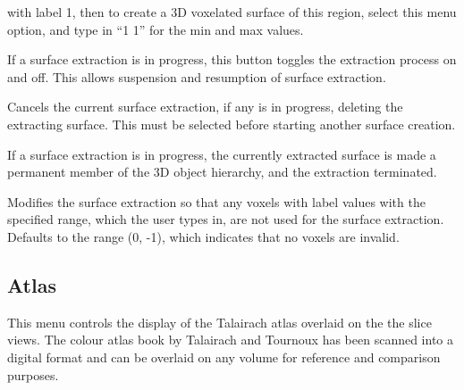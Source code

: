 \documentclass[11pt,letterpaper]{article}
\newcommand{\menutwo}[2]{{\scriptsize \fbox{\bf #1}/\fbox{\bf #2}}}
\begin{document}
\begin{description}
    with label 1, then to create a 3D voxelated surface of this region,
    select this menu option, and type in ``1 1'' for the min and max values.
\item[\menutwo{Create Surface}{Extracting}]  If a surface extraction
    is in progress, this button toggles the extraction process on and
    off.  This allows suspension and resumption of surface extraction.
\item[\menutwo{Create Surface}{Reset Surface}]  Cancels the current
    surface extraction, if any is in progress, deleting the extracting
    surface.  This must be selected before starting
    another surface creation.
\item[\menutwo{Create Surface}{Make Permanent}]  If a surface extraction
    is in progress, the currently extracted surface is made a permanent
    member of the 3D object hierarchy, and the extraction terminated.
\item[\menutwo{Create Surface}{Set Invalid Lbl Range}]  Modifies the surface
    extraction so that any voxels with label values with the specified range,
    which the user types in, are not used for the surface extraction.
    Defaults to the range (0, -1), which indicates that no voxels are invalid.
\end{description}

\subsection{Atlas}

This menu controls the display of the Talairach atlas overlaid on the
the slice views.  The colour atlas book by Talairach and Tournoux
has been scanned into a digital
format and can be overlaid on any volume for reference and comparison
purposes.
\end{document}
